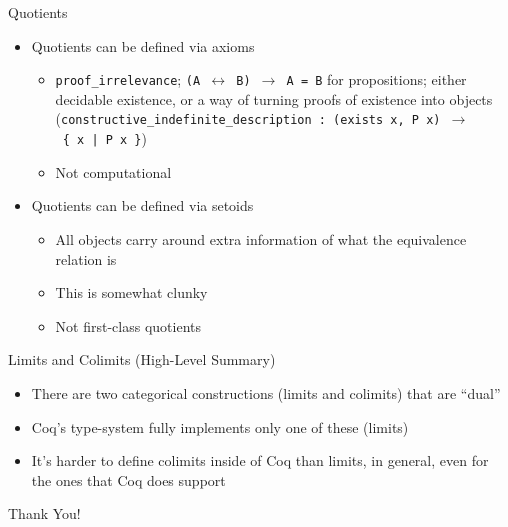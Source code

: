 \documentclass[utf8x]{beamer}
\begin{document}
    \begin{frame}{Quotients}
      \begin{itemize}
        \item Quotients can be defined via axioms \pause
        \begin{itemize}
          \item
            \texttt{proof\_irrelevance}; \texttt{(A $\leftrightarrow$ B) $\to$ A = B} for propositions; either decidable existence, or a way of turning proofs of existence into objects (\texttt{constructive\_indefinite\_description : (exists~x,~P~x)~$\to$~\{~x~|~P~x~\}})
          \item
            Not computational
        \end{itemize} \pause
        \item Quotients can be defined via setoids \pause
        \begin{itemize}
          \item
            All objects carry around extra information of what the equivalence relation is
          \item
            This is somewhat clunky
          \item
            Not first-class quotients
        \end{itemize}
      \end{itemize}
    \end{frame}

    \begin{frame}{Limits and Colimits (High-Level Summary)}
      \begin{itemize}
        \item
          There are two categorical constructions (limits and colimits) that are ``dual'' \pause
        \item
          Coq's type-system fully implements only one of these (limits) \pause
        \item
          It's harder to define colimits inside of Coq than limits, in general, even for the ones that Coq does support
      \end{itemize}
    \end{frame}

  \begin{frame}
    \fontsize{128}{0}\selectfont\begin{center}Thank You!\end{center}
  \end{frame}
\end{document}
